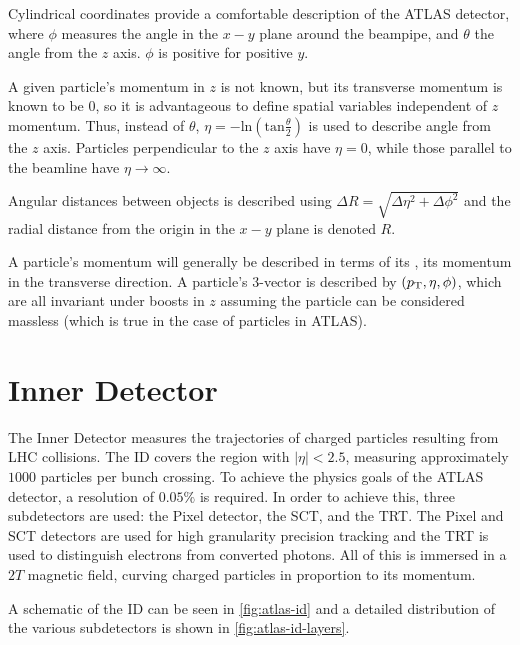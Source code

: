 Cylindrical coordinates provide a comfortable description of the \ac{ATLAS} detector, where $\phi$ measures the angle in the $x-y$ plane around the beampipe, and $\theta$ the angle from the $z$ axis. $\phi$ is positive for positive $y$. 

A given particle's momentum in $z$ is not known, but its transverse momentum is known to be $0$, so it is advantageous to define spatial variables independent of $z$ momentum. Thus, instead of $\theta$, $\eta = - \textrm{ln}(\textrm{tan}\frac{\theta}{2})$ is used to describe angle from the $z$ axis. Particles perpendicular to the $z$ axis have $\eta = 0$, while those parallel to the beamline have $\eta \rightarrow \infty$. 

Angular distances between objects is described using $\Delta R = \sqrt{\Delta \eta ^2 + \Delta \phi ^2}$ and the radial distance from the origin in the $x-y$ plane is denoted $R$. 

A particle's momentum will generally be described in terms of its \pT, its momentum in the transverse direction. A particle's $3$-vector is described by $(p_{\text{T}}, \eta, \phi)$, which are all invariant under boosts in $z$ assuming the particle can be considered massless (which is true in the case of particles in \ac{ATLAS}).




\section{Inner Detector}
The Inner Detector measures the trajectories of charged particles resulting from \ac{LHC} collisions. The \ac{ID} covers the region with $|\eta| < 2.5$, measuring approximately $1000$ particles per bunch crossing. To achieve the physics goals of the \ac{ATLAS} detector, a \pt resolution of $0.05\%$ is required. In order to achieve this, three subdetectors are used: the Pixel detector, the \ac{SCT}, and the \ac{TRT}. The Pixel and \ac{SCT} detectors are used for high granularity precision tracking and the \ac{TRT} is used to distinguish electrons from converted photons. All of this is immersed in a $2T$ magnetic field, curving charged particles in proportion to its momentum.


A schematic of the \ac{ID} can be seen in \autoref{fig:atlas-id} and a detailed distribution of the various subdetectors is shown in \autoref{fig:atlas-id-layers}. 


